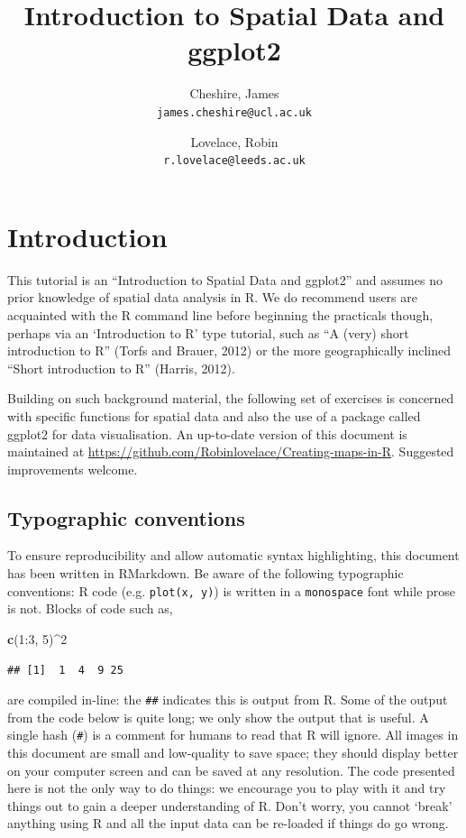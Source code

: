 \documentclass[]{article}
\author{
Cheshire, James\\
\texttt{james.cheshire@ucl.ac.uk}
\and
Lovelace, Robin\\
\texttt{r.lovelace@leeds.ac.uk}
}
\title{Introduction to Spatial Data and ggplot2}
\newenvironment{Shaded}{}{}
\newcommand{\KeywordTok}[1]{\textcolor[rgb]{0.00,0.44,0.13}{\textbf{{#1}}}}
\newcommand{\DecValTok}[1]{\textcolor[rgb]{0.25,0.63,0.44}{{#1}}}
\newcommand{\NormalTok}[1]{{#1}}
\begin{document}
\maketitle

\section{Introduction}

This tutorial is an ``Introduction to Spatial Data and ggplot2'' and
assumes no prior knowledge of spatial data analysis in R. We do
recommend users are acquainted with the R command line before beginning
the practicals though, perhaps via an `Introduction to R' type tutorial,
such as ``A (very) short introduction to R'' (Torfs and Brauer, 2012) or
the more geographically inclined ``Short introduction to R'' (Harris,
2012).

Building on such background material, the following set of exercises is
concerned with specific functions for spatial data and also the use of a
package called ggplot2 for data visualisation. An up-to-date version of
this document is maintained at
\href{https://github.com/Robinlovelace/Creating-maps-in-R/blob/master/intro-spatial-rl.pdf}{https://github.com/Robinlovelace/Creating-maps-in-R}.
Suggested improvements welcome.

\subsection{Typographic conventions}

To ensure reproducibility and allow automatic syntax highlighting, this
document has been written in RMarkdown. Be aware of the following
typographic conventions: R code (e.g. \texttt{plot(x, y)}) is written in
a \texttt{monospace} font while prose is not. Blocks of code such as,

\begin{Shaded}
\begin{Highlighting}[]
\KeywordTok{c}\NormalTok{(}\DecValTok{1}\NormalTok{:}\DecValTok{3}\NormalTok{, }\DecValTok{5}\NormalTok{)^}\DecValTok{2}
\end{Highlighting}
\end{Shaded}
\begin{verbatim}
## [1]  1  4  9 25
\end{verbatim}
are compiled in-line: the \texttt{\#\#} indicates this is output from R.
Some of the output from the code below is quite long; we only show the
output that is useful. A single hash (\texttt{\#}) is a comment for
humans to read that R will ignore. All images in this document are small
and low-quality to save space; they should display better on your
computer screen and can be saved at any resolution. The code presented
here is not the only way to do things: we encourage you to play with it
and try things out to gain a deeper understanding of R. Don't worry, you
cannot `break' anything using R and all the input data can be re-loaded
if things do go wrong.
\end{document}
